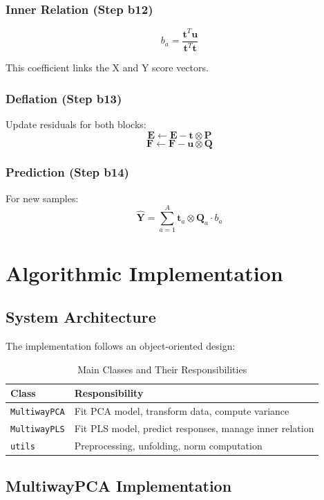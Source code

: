 \documentclass[12pt,a4paper]{article}
\begin{document}
\subsubsection{Inner Relation (Step b12)}
$$b_a = \frac{\mathbf{t}^T \mathbf{u}}{\mathbf{t}^T \mathbf{t}}$$

This coefficient links the X and Y score vectors.

\subsubsection{Deflation (Step b13)}
Update residuals for both blocks:
$$\mathbf{E} \leftarrow \mathbf{E} - \mathbf{t} \otimes \mathbf{P}$$
$$\mathbf{F} \leftarrow \mathbf{F} - \mathbf{u} \otimes \mathbf{Q}$$

\subsubsection{Prediction (Step b14)}
For new samples:
$$\hat{\mathbf{Y}} = \sum_{a=1}^{A} \mathbf{t}_a \otimes \mathbf{Q}_a \cdot b_a$$

\newpage

\section{Algorithmic Implementation}

\subsection{System Architecture}

The implementation follows an object-oriented design:

\begin{table}[H]
\centering
\caption{Main Classes and Their Responsibilities}
\begin{tabular}{lp{8cm}}
\toprule
\textbf{Class} & \textbf{Responsibility} \\
\midrule
\texttt{MultiwayPCA} & Fit PCA model, transform data, compute variance \\
\texttt{MultiwayPLS} & Fit PLS model, predict responses, manage inner relation \\
\texttt{utils} & Preprocessing, unfolding, norm computation \\
\bottomrule
\end{tabular}
\end{table}

\subsection{MultiwayPCA Implementation}
\end{document}
